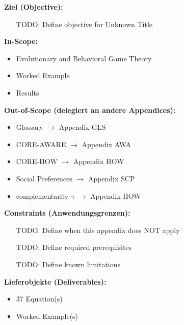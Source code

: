 
\begin{tcolorbox}[
    colback=orange!5!white,
    colframe=orange!75!black,
    title={\textbf{Appendix Scope: Ziel / In-Scope / Out-of-Scope / Constraints}},
    fonttitle=\bfseries
]

\textbf{Ziel (Objective):}
\begin{itemize}[nosep]
    \item [TODO: Define objective for Unknown Title]
\end{itemize}

\textbf{In-Scope:}
\begin{itemize}[nosep]
    \item Evolutionary and Behavioral Game Theory
    \item Worked Example
    \item Results
\end{itemize}

\textbf{Out-of-Scope (delegiert an andere Appendices):}
\begin{itemize}[nosep]
    \item Glossary $\rightarrow$ Appendix GLS
    \item CORE-AWARE $\rightarrow$ Appendix AWA
    \item CORE-HOW $\rightarrow$ Appendix HOW
    \item Social Preferences $\rightarrow$ Appendix SCP
    \item complementarity $\gamma$ $\rightarrow$ Appendix HOW
\end{itemize}

\textbf{Constraints (Anwendungsgrenzen):}
\begin{itemize}[nosep]
    \item [TODO: Define when this appendix does NOT apply]
    \item [TODO: Define required prerequisites]
    \item [TODO: Define known limitations]
\end{itemize}

\textbf{Lieferobjekte (Deliverables):}
\begin{itemize}[nosep]
    \item 37 Equation(s)
    \item Worked Example(s)
\end{itemize}

\end{tcolorbox}


